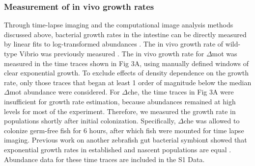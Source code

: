 \subsubsection{Measurement of in vivo growth rates}
Through time-lapse imaging and the computational image analysis methods discussed above, bacterial growth rates in the intestine can be directly measured by linear fits to log-transformed abundances \cite{wiles_host_2016,schlomann_sublethal_2019,jemielita_spatial_2014}. The in vivo growth rate of wild-type Vibrio was previously measured \cite{wiles_host_2016}. The in vivo growth rate for $\Delta$mot was measured in the time traces shown in Fig 3A, using manually defined windows of clear exponential growth. To exclude effects of density dependence on the growth rate, only those traces that began at least 1 order of magnitude below the median $\Delta$mot abundance were considered. For $\Delta$che, the time traces in Fig 3A were insufficient for growth rate estimation, because abundances remained at high levels for most of the experiment. Therefore, we measured the growth rate in populations shortly after initial colonization. Specifically, $\Delta$che was allowed to colonize germ-free fish for 6 hours, after which fish were mounted for time lapse imaging. Previous work on another zebrafish gut bacterial symbiont showed that exponential growth rates in established and nascent populations are equal \cite{wiles_host_2016}. Abundance data for these time traces are included in the S1 Data.


